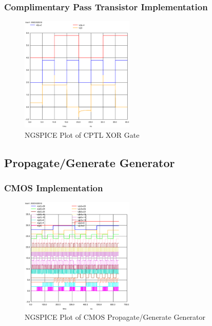 \documentclass[conference]{IEEEtran}
\begin{document}
\subsubsection{Complimentary Pass Transistor Implementation}

\begin{figure}[H]
    \centering
    \includegraphics[width=0.48\textwidth]{images/xor_optimized_tran.eps}
    \caption{NGSPICE Plot of CPTL XOR Gate}
\end{figure}

\subsection{Propagate/Generate Generator}

\subsubsection{CMOS Implementation}

\begin{figure}[H]
    \centering
    \includegraphics[width=0.48\textwidth]{images/pg_gen_cmos_tran.eps}
    \caption{NGSPICE Plot of CMOS Propagate/Generate Generator}
\end{figure}
\end{document}

